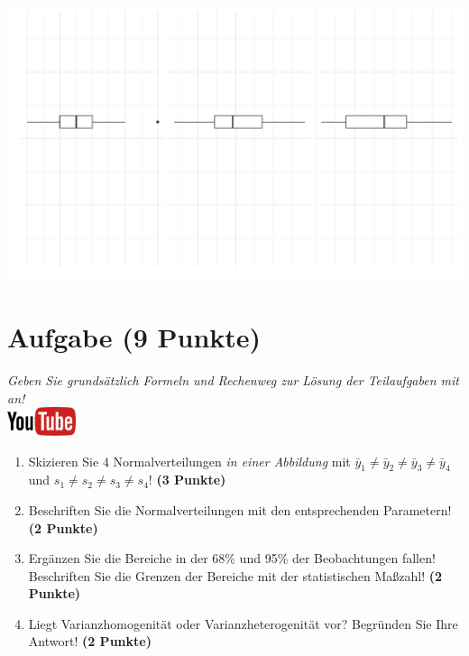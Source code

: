 \documentclass[a4paper, 9pt]{scrartcl}\usepackage[]{graphicx}\usepackage[]{xcolor}
\makeatletter
\def\maxwidth{ %
  \ifdim\Gin@nat@width>\linewidth
    \linewidth
  \else
    \Gin@nat@width
  \fi
}
\makeatother
\begin{document}
{\centering \includegraphics[width=\maxwidth]{img/desc-stat-11-1} 

}




 
\clearpage

\section{Aufgabe \hfill (9 Punkte)}

\textit{Geben Sie grunds{\"a}tzlich Formeln und Rechenweg zur L{\"o}sung der
  Teilaufgaben mit an!} \\[1Ex]

\hfill\href{https://youtu.be/ZrJhn2wPbq4}{\includegraphics[width =
  2cm]{img/youtube}}\\[1Ex]



\begin{enumerate}
\item Skizieren Sie $4$ Normalverteilungen \textit{in einer
    Abbildung} mit $\bar{y}_1 \neq \bar{y}_2 \neq \bar{y}_3 \neq \bar{y}_4$ und $s_1 \neq s_2 \neq s_3 \neq s_4$! \textbf{(3 Punkte)}
\item Beschriften Sie die Normalverteilungen mit den entsprechenden
  Parametern! \textbf{(2 Punkte)}
\item Erg{\"a}nzen Sie die Bereiche in der 68\% und 95\% der Beobachtungen
  fallen! Beschriften Sie die Grenzen der Bereiche mit der statistischen Ma{\ss}zahl! \textbf{(2 Punkte)}
\item Liegt Varianzhomogenit{\"a}t oder Varianzheterogenit{\"a}t vor? Begr{\"u}nden Sie
  Ihre Antwort! \textbf{(2 Punkte)}
\end{enumerate}
\end{document}
